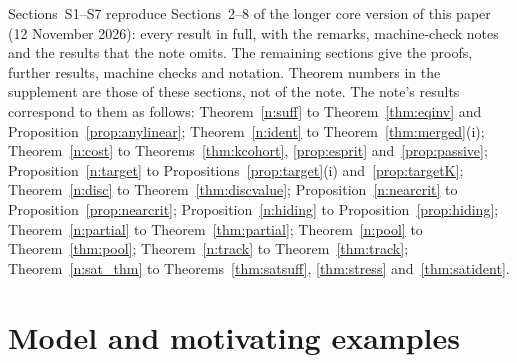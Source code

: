 \documentclass[12pt]{article}
\theoremstyle{definition}
\theoremstyle{remark}
\begin{document}
\noindent Sections~S1--S7 reproduce Sections~2--8 of the longer core version of this paper (12 November 2026): every result in full, with the remarks, machine-check notes and the results that the note omits. The remaining sections give the proofs, further results, machine checks and notation. Theorem numbers in the supplement are those of these sections, not of the note. The note's results correspond to them as follows: Theorem~\ref{n:suff} to Theorem~\ref{thm:eqinv} and Proposition~\ref{prop:anylinear}; Theorem~\ref{n:ident} to Theorem~\ref{thm:merged}(i); Theorem~\ref{n:cost} to Theorems~\ref{thm:kcohort}, \ref{prop:esprit} and~\ref{prop:passive}; Proposition~\ref{n:target} to Propositions~\ref{prop:target}(i) and~\ref{prop:targetK}; Theorem~\ref{n:disc} to Theorem~\ref{thm:discvalue}; Proposition~\ref{n:nearcrit} to Proposition~\ref{prop:nearcrit}; Proposition~\ref{n:hiding} to Proposition~\ref{prop:hiding}; Theorem~\ref{n:partial} to Theorem~\ref{thm:partial}; Theorem~\ref{n:pool} to Theorem~\ref{thm:pool}; Theorem~\ref{n:track} to Theorem~\ref{thm:track}; Theorem~\ref{n:sat_thm} to Theorems~\ref{thm:satsuff}, \ref{thm:stress} and~\ref{thm:satident}.

\section{Model and motivating examples}\label{sec:model}
\end{document}
